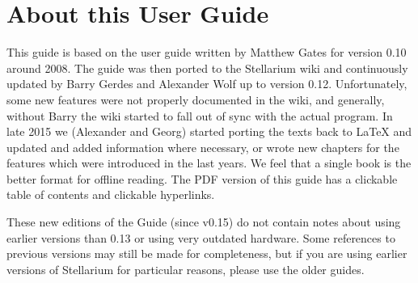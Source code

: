 \section{About this User Guide}
This guide is based on the user guide written by Matthew Gates for
version 0.10 around 2008. The guide was then ported to the Stellarium
wiki and continuously updated by Barry Gerdes and Alexander Wolf up to version 0.12. 
Unfortunately, some new features were not properly documented in the wiki, and generally, 
without Barry the wiki started to fall out of sync with
the actual program.  In late 2015 we (Alexander and Georg) started porting the texts
back to \LaTeX{} and updated and added information where necessary, 
or wrote new chapters for the features which were introduced in the last years. 
We feel that a single book is the better format for offline
reading. The PDF version of this guide has a clickable table of
contents and clickable hyperlinks.

These new editions of the Guide (since v0.15) do not contain notes about using
earlier versions than 0.13 or using very outdated hardware.
Some references to previous versions may still be made for completeness, 
but if you are using earlier versions of Stellarium 
for particular reasons, please use the older guides.


